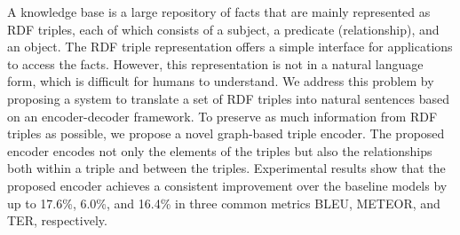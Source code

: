 A knowledge base is a large repository of facts that are mainly represented as RDF triples, each of which consists of a subject, a predicate (relationship), and an object. The RDF triple representation offers a simple interface for applications to access the facts. However, this representation is not in a natural language form, which is difficult for humans to understand. We address this problem by proposing a system to translate a set of RDF triples into natural sentences based on an encoder-decoder framework. To preserve as much information from RDF triples as possible, we propose a novel graph-based triple encoder. The proposed encoder encodes not only the elements of the triples but also the relationships both within a triple and between the triples. Experimental results show that the proposed encoder achieves a consistent improvement over the baseline models by up to 17.6\%, 6.0\%, and 16.4\% in three common metrics BLEU, METEOR, and TER, respectively.
